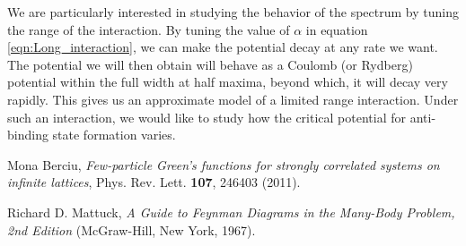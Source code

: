 \documentclass[a4paper, 11pt]{report}
\begin{document}
We are particularly interested in studying the behavior of the spectrum by tuning the range of the interaction. By tuning the value of $\alpha$ in equation \ref{eqn:Long_interaction}, we can make the potential decay at any rate we want. The potential we will then obtain will behave as a Coulomb (or Rydberg) potential within the full width at half maxima, beyond which, it will decay very rapidly. This gives us an approximate model of a limited range interaction. Under such an interaction, we would like to study how the critical potential for anti-binding state formation varies.




















\begin{thebibliography}{99}
Mona Berciu, \textit{Few-particle Green's functions for strongly correlated systems on infinite lattices},  Phys. Rev. Lett. \textbf{107}, 246403 (2011).

Richard D. Mattuck, \textit{A Guide to Feynman Diagrams in the Many-Body Problem, 2nd Edition} (McGraw-Hill, New York, 1967).
\end{thebibliography}
\end{document}
